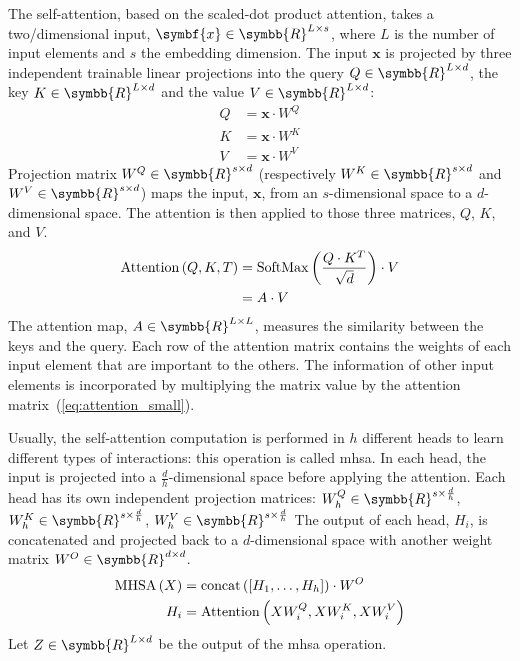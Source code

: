 \documentclass[../main.tex]{subfiles}
\begin{document}
		The self-attention, based on the scaled-dot product attention, takes a two\-/dimensional input, \(\symbf{x} \in \symbb{R}^{L\times s}\), where \(L\) is the number of input elements and \(s\) the embedding dimension.
		The input \(\symbf{x}\) is projected by three independent trainable linear projections into the query \(Q \in \symbb{R}^{L \times d}\), the key \(K \in \symbb{R}^{L \times d}\) and the value \(V \in \symbb{R}^{L \times d}\):
		\begin{align}
			Q & = \symbf{x}\cdot W^{Q} \\
			K & = \symbf{x}\cdot W^{K} \\
			V & = \symbf{x}\cdot W^{V}
		\end{align}
		Projection matrix \(W^Q \in \symbb{R}^{s \times d} \) (respectively \(W^K\in \symbb{R}^{s \times d}\) and \(W^V\in \symbb{R}^{s \times d}\)) maps the input, \(\symbf{x}\), from an \(s\)-dimensional space to a \(d\)-dimensional space.
		The attention is then applied to those three matrices, \(Q\), \(K\), and \(V\).
		\begin{align}
			\operatorname{Attention}\left(Q,K,T\right) & = \softmax\left( \frac{Q\cdot K^T}{\sqrt{d}}\right) \cdot V\label{eq:selfattention} \\
			                                           & = A \cdot V \label{eq:attention_small}
		\end{align}
		The attention map, \(A \in \symbb{R}^{L \times L}\), measures the similarity between the keys and the query.
		Each row of the attention matrix contains the weights of each input element that are important to the others.
		The information of other input elements is incorporated by multiplying the matrix value by the attention matrix~(\cref{eq:attention_small}).

		Usually, the self-attention computation is performed in \(h\) different heads to learn different types of interactions: this operation is called \gls{mhsa}.
		In each head, the input is projected into a \(\frac{d}{h}\)-dimensional space before applying the attention.
		Each head has its own independent projection matrices: \(W^Q_h \in \symbb{R}^{s \times \frac{d}{h}}\), \(W^K_h \in \symbb{R}^{s \times \frac{d}{h}}\), \(W^V_h \in \symbb{R}^{s \times \frac{d}{h}}\)
		The output of each head, \(H_i\), is concatenated and projected back to a \(d\)-dimensional space with another weight matrix \(W^O \in \symbb{R}^{d \times d}\).
		\begin{align}
			\operatorname{MHSA}\left(X\right) & = \operatorname{concat}\left(\left[H_1, \ldots, H_h \right] \right)\cdot W^O \\
			H_i                 & = \operatorname{Attention}\left(XW^Q_i, XW^K_i, XW^V_i\right)
		\end{align}
		Let \(Z \in \symbb{R}^{L \times d}\) be the output of the \gls{mhsa} operation.
\end{document}
